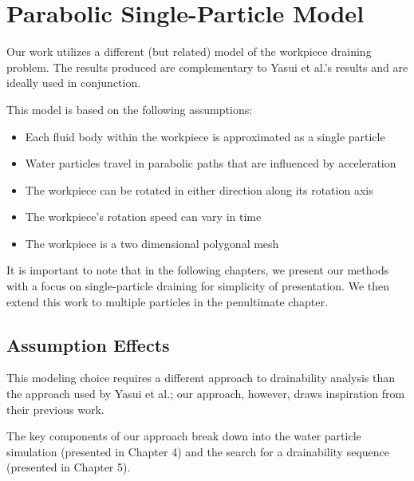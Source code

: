 


\section{Parabolic Single-Particle Model}

Our work utilizes a different (but related) model of the workpiece draining problem. The results produced are complementary to Yasui et al.'s results and are ideally used in conjunction.

This model is based on the following assumptions:

\begin{itemize}
	\item Each fluid body within the workpiece is approximated as a single particle
	\item Water particles travel in parabolic paths that are influenced by acceleration
	\item The workpiece can be rotated in either direction along its rotation axis
	\item The workpiece's rotation speed can vary in time
	\item The workpiece is a two dimensional polygonal mesh
\end{itemize}

It is important to note that in the following chapters, we present our methods with a focus on single-particle draining for simplicity of presentation. We then extend this work to multiple particles in the penultimate chapter.

	\subsection{Assumption Effects}

This modeling choice requires a different approach to drainability analysis than the approach used by Yasui et al.; our approach, however, draws inspiration from their previous work.

The key components of our approach break down into the water particle simulation (presented in Chapter 4) and the search for a drainability sequence (presented in Chapter 5).



